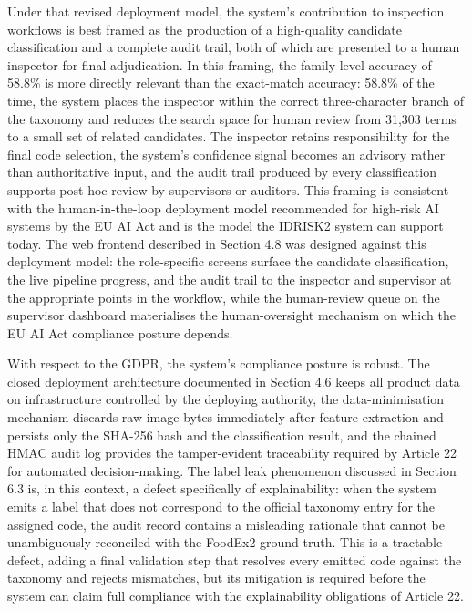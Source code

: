 Under that revised deployment model, the system's contribution to inspection workflows is best framed as the production of a high-quality candidate classification and a complete audit trail, both of which are presented to a human inspector for final adjudication. In this framing, the family-level accuracy of 58.8\% is more directly relevant than the exact-match accuracy: 58.8\% of the time, the system places the inspector within the correct three-character branch of the taxonomy and reduces the search space for human review from 31,303 terms to a small set of related candidates. The inspector retains responsibility for the final code selection, the system's confidence signal becomes an advisory rather than authoritative input, and the audit trail produced by every classification supports post-hoc review by supervisors or auditors. This framing is consistent with the human-in-the-loop deployment model recommended for high-risk AI systems by the EU AI Act and is the model the IDRISK2 system can support today. The web frontend described in Section 4.8 was designed against this deployment model: the role-specific screens surface the candidate classification, the live pipeline progress, and the audit trail to the inspector and supervisor at the appropriate points in the workflow, while the human-review queue on the supervisor dashboard materialises the human-oversight mechanism on which the EU AI Act compliance posture depends.

With respect to the GDPR, the system's compliance posture is robust. The closed deployment architecture documented in Section 4.6 keeps all product data on infrastructure controlled by the deploying authority, the data-minimisation mechanism discards raw image bytes immediately after feature extraction and persists only the SHA-256 hash and the classification result, and the chained HMAC audit log provides the tamper-evident traceability required by Article 22 for automated decision-making. The label leak phenomenon discussed in Section 6.3 is, in this context, a defect specifically of explainability: when the system emits a label that does not correspond to the official taxonomy entry for the assigned code, the audit record contains a misleading rationale that cannot be unambiguously reconciled with the FoodEx2 ground truth. This is a tractable defect, adding a final validation step that resolves every emitted code against the taxonomy and rejects mismatches, but its mitigation is required before the system can claim full compliance with the explainability obligations of Article 22.

